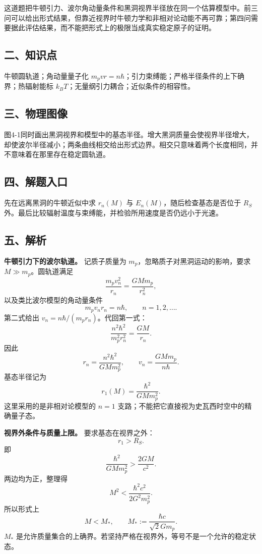 \documentclass[12pt,a4paper,UTF8]{ctexart}
\begin{document}
这道题把牛顿引力、波尔角动量条件和黑洞视界半径放在同一个估算模型中。前三问可以给出形式结果，但靠近视界时牛顿力学和非相对论动能不再可靠；第四问需要据此评估结果，而不能把形式上的极限当成真实稳定原子的证明。

\subsection{二、知识点}\label{ux4e8cux77e5ux8bc6ux70b9-3}

牛顿圆轨道；角动量量子化
\(m_pvr=n\hbar\)；引力束缚能；严格半径条件的上下确界；热辐射能标
\(k_BT\)；无量纲引力耦合；近似条件的相容性。

\subsection{三、物理图像}\label{ux4e09ux7269ux7406ux56feux50cf-3}

图4-1同时画出黑洞视界和模型中的基态半径。增大黑洞质量会使视界半径增大，却使波尔半径减小；两条曲线相交给出形式边界。相交只意味着两个长度相同，并不意味着在那里存在稳定圆轨道。

\subsection{四、解题入口}\label{ux56dbux89e3ux9898ux5165ux53e3-3}

先在远离黑洞的牛顿近似中求 \(r_n(M)\) 与
\(E_n(M)\)，随后检查基态是否位于 \(R_S\)
外。最后比较辐射温度与束缚能，并检验所用速度是否仍远小于光速。

\subsection{五、解析}\label{ux4e94ux89e3ux6790-3}

\textbf{牛顿引力下的波尔轨道。} 记质子质量为
\(m_p\)，忽略质子对黑洞运动的影响，要求 \(M\gg m_p\)。圆轨道满足 \[
\frac{m_pv_n^2}{r_n}=\frac{GMm_p}{r_n^2},
\] 以及类比波尔模型的角动量条件 \[
m_pv_nr_n=n\hbar,\qquad n=1,2,\ldots .
\] 第二式给出 \(v_n=n\hbar/(m_pr_n)\)。代回第一式： \[
\frac{n^2\hbar^2}{m_p^2r_n^2}=\frac{GM}{r_n}.
\] 因此 \[
\boxed{r_n=\frac{n^2\hbar^2}{GMm_p^2}},
\qquad
\boxed{v_n=\frac{GMm_p}{n\hbar}}.
\] 基态半径记为 \[
r_1(M)=\frac{\hbar^2}{GMm_p^2}.
\] 这里采用的是非相对论模型的 \(n=1\)
支路；不能把它直接视为史瓦西时空中的精确量子态。

\textbf{视界外条件与质量上限。} 要求基态在视界之外： \[
r_1>R_S.
\] 即 \[
\frac{\hbar^2}{GMm_p^2}>\frac{2GM}{c^2}.
\] 两边均为正，整理得 \[
M^2<\frac{\hbar^2c^2}{2G^2m_p^2}.
\] 所以形式上 \[
\boxed{M<M_*},
\qquad
\boxed{M_*:=\frac{\hbar c}{\sqrt2Gm_p}}.
\] \(M_*\)
是允许质量集合的上确界。若坚持严格在视界外，等号不是一个允许的稳定状态。
\end{document}
